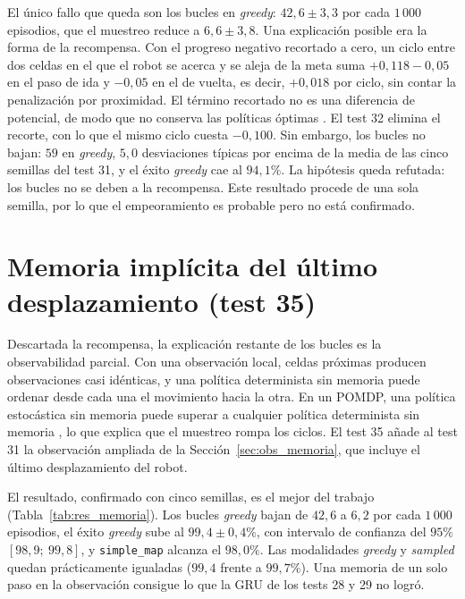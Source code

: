 El único fallo que queda son los bucles en \textit{greedy}:
$42{,}6 \pm 3{,}3$ por cada $1\,000$ episodios, que el muestreo reduce a
$6{,}6 \pm 3{,}8$. Una explicación posible era la forma de la
recompensa. Con el progreso negativo recortado a cero, un ciclo entre
dos celdas en el que el robot se acerca y se aleja de la meta suma
$+0{,}118 - 0{,}05$ en el paso de ida y $-0{,}05$ en el de vuelta, es
decir, $+0{,}018$ por ciclo, sin contar la penalización por proximidad.
El término recortado no es una diferencia de potencial, de modo que no
conserva las políticas óptimas \citep{ng1999policy}. El test 32 elimina
el recorte, con lo que el mismo ciclo cuesta $-0{,}100$. Sin embargo, los
bucles no bajan: $59$ en \textit{greedy}, $5{,}0$ desviaciones típicas
por encima de la media de las cinco semillas del test 31, y el éxito
\textit{greedy} cae al $94{,}1\%$. La hipótesis queda refutada: los
bucles no se deben a la recompensa. Este resultado procede de una sola
semilla, por lo que el empeoramiento es probable pero no está confirmado.

\section{Memoria implícita del último desplazamiento (test 35)}\label{sec:res_memoria}
Descartada la recompensa, la explicación restante de los bucles es la
observabilidad parcial. Con una observación local, celdas próximas
producen observaciones casi idénticas, y una política determinista sin
memoria puede ordenar desde cada una el movimiento hacia la otra. En un
POMDP, una política estocástica sin memoria puede superar a cualquier
política determinista sin memoria \citep{singh1994learning}, lo que
explica que el muestreo rompa los ciclos. El test 35 añade al test 31 la
observación ampliada de la Sección~\ref{sec:obs_memoria}, que incluye el
último desplazamiento del robot.

El resultado, confirmado con cinco semillas, es el mejor del trabajo
(Tabla~\ref{tab:res_memoria}). Los bucles \textit{greedy} bajan de
$42{,}6$ a $6{,}2$ por cada $1\,000$ episodios, el éxito \textit{greedy}
sube al $99{,}4 \pm 0{,}4\%$, con intervalo de confianza del $95\%$
$[98{,}9;\ 99{,}8]$, y \texttt{simple\_map} alcanza el $98{,}0\%$. Las
modalidades \textit{greedy} y \textit{sampled} quedan prácticamente
igualadas ($99{,}4$ frente a $99{,}7\%$). Una memoria de un solo paso en
la observación consigue lo que la GRU de los tests 28 y 29 no logró.


